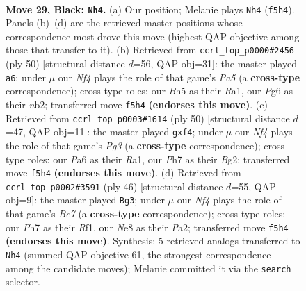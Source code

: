 \documentclass[11pt]{article}
\begin{document}
\clearpage

\begin{figure}[p]\centering
\begin{subfigure}{0.46\textwidth}\centering
\resizebox{\linewidth}{!}{%
\newchessgame
\chessboard[
  setfen={1r2n1k1/2p2p1p/p1P3p1/4pn1b/P7/8/2B3P1/RNB3K1 b - - 0 29},
  showmover=false,
  pgfstyle=straightmove, color=movearrow, markmove={f5-h4}
]}
\caption{}
\end{subfigure}\hfill
\begin{subfigure}{0.46\textwidth}\centering
\resizebox{\linewidth}{!}{%
\newchessgame
\chessboard[
  setfen={7r/ppk2p1p/2p5/P4N2/1b2BP2/4P3/1n2KP1P/R7 w - - 3 26},
  showmover=false,
  pgfstyle=straightmove, color=movearrow, markmove={a5-a6}
]}
\caption{}
\end{subfigure}
\\[4pt]
\begin{subfigure}{0.46\textwidth}\centering
\resizebox{\linewidth}{!}{%
\newchessgame
\chessboard[
  setfen={1n1r2k1/1b6/p3p2p/1p6/4Nb2/2P3P1/PP4BP/R5K1 w - - 0 26},
  showmover=false,
  pgfstyle=straightmove, color=movearrow, markmove={g3-f4}
]}
\caption{}
\end{subfigure}\hfill
\begin{subfigure}{0.46\textwidth}\centering
\resizebox{\linewidth}{!}{%
\newchessgame
\chessboard[
  setfen={2r3k1/ppB4p/5b2/6p1/NnP1p1P1/1P6/P4PP1/5RK1 w - - 2 24},
  showmover=false,
  pgfstyle=straightmove, color=movearrow, markmove={c7-g3}
]}
\caption{}
\end{subfigure}
\caption{\textbf{Move 29, Black: \texttt{Nh4}.} (a) Our position; Melanie plays \texttt{Nh4} (\texttt{f5h4}). Panels (b)--(d) are the retrieved master positions whose correspondence most drove this move (highest QAP objective among those that transfer to it). (b) Retrieved from \texttt{ccrl\_top\_p0000\#2456} (ply 50) [structural distance $d$=56, QAP obj=31]: the master played \texttt{a6}; under $\mu$ our \emph{Nf4} plays the role of that game's \emph{Pa5} (a \textbf{cross-type} correspondence); cross-type roles: our \emph{B}h5 as their \emph{R}a1, our \emph{P}g6 as their \emph{n}b2; transferred move \texttt{f5h4} \textbf{(endorses this move)}. (c) Retrieved from \texttt{ccrl\_top\_p0003\#1614} (ply 50) [structural distance $d$=47, QAP obj=11]: the master played \texttt{gxf4}; under $\mu$ our \emph{Nf4} plays the role of that game's \emph{Pg3} (a \textbf{cross-type} correspondence); cross-type roles: our \emph{P}a6 as their \emph{R}a1, our \emph{P}h7 as their \emph{B}g2; transferred move \texttt{f5h4} \textbf{(endorses this move)}. (d) Retrieved from \texttt{ccrl\_top\_p0002\#3591} (ply 46) [structural distance $d$=55, QAP obj=9]: the master played \texttt{Bg3}; under $\mu$ our \emph{Nf4} plays the role of that game's \emph{Bc7} (a \textbf{cross-type} correspondence); cross-type roles: our \emph{P}h7 as their \emph{R}f1, our \emph{N}e8 as their \emph{P}a2; transferred move \texttt{f5h4} \textbf{(endorses this move)}. Synthesis: 5 retrieved analogs transferred to \texttt{Nh4} (summed QAP objective 61, the strongest correspondence among the candidate moves); Melanie committed it via the \texttt{search} selector.}
\label{fig:thought-m57}
\end{figure}
\end{document}
